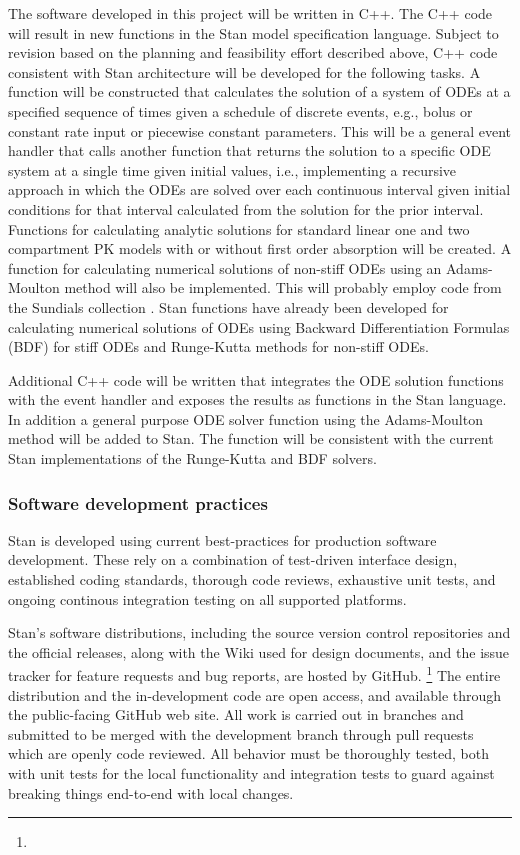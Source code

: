 The software developed in this project will be written in C++. The C++
code will result in new functions in the Stan model specification
language. Subject to revision based on the planning and feasibility
effort described above, C++ code consistent with Stan architecture
will be developed for the following tasks. A function will be
constructed that calculates the solution of a system of ODEs at a
specified sequence of times given a schedule of discrete events, e.g.,
bolus or constant rate input or piecewise constant parameters. This
will be a general event handler that calls another function that
returns the solution to a specific ODE system at a single time given
initial values, i.e., implementing a recursive approach in which the
ODEs are solved over each continuous interval given initial conditions
for that interval calculated from the solution for the prior
interval. Functions for calculating analytic solutions for standard
linear one and two compartment PK models with or without first order
absorption will be created.  A function for calculating numerical
solutions of non-stiff ODEs using an Adams-Moulton method will also be
implemented. This will probably employ code from the Sundials
collection \citep{hindmarsh-et-al:2005}. Stan functions have already
been developed for calculating numerical solutions of ODEs using
Backward Differentiation Formulas (BDF) for stiff ODEs and Runge-Kutta
methods for non-stiff ODEs.

Additional C++ code will be written that integrates the ODE solution
functions with the event handler and exposes the results as functions
in the Stan language. In addition a general purpose ODE solver
function using the Adams-Moulton method will be added to Stan. The function
will be consistent with the current Stan implementations of the
Runge-Kutta and BDF solvers.

\subsubsection{Software development practices}

Stan is developed using current best-practices for production software
development.  These rely on a combination of test-driven interface
design, established coding standards, thorough code reviews,
exhaustive unit tests, and ongoing continous integration testing
on all supported platforms.

Stan's software distributions, including the source version control
repositories and the official releases, along with the Wiki used for
design documents, and the issue tracker for feature requests and bug
reports, are hosted by GitHub.%
%
\footnote{}
%
The entire distribution and the in-development code are open access,
and available through the public-facing GitHub web site.  All work is
carried out in branches and submitted to be merged with the
development branch through pull requests which are openly code
reviewed.  All behavior must be thoroughly tested, both with unit
tests for the local functionality and integration tests to guard
against breaking things end-to-end with local changes.


